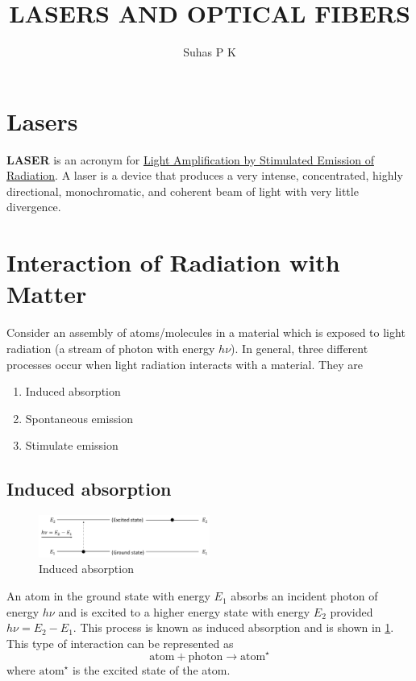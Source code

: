 \documentclass[12pt]{article}
\title{LASERS AND OPTICAL FIBERS}
\author{Suhas P K}
\affil{Department of Physics,\\ AMCEC}
\date{}
\begin{document}
\maketitle
\newpage


\newpage
\tableofcontents
\newpage

\section{Lasers}
\label{sec:Lasers}
\textbf{LASER} is an acronym for \underline{Light Amplification by Stimulated Emission of Radiation}.
A laser is a device that produces a very intense, concentrated, highly directional, monochromatic, and coherent beam of light with very little divergence.

\section{Interaction of Radiation with Matter}
Consider an assembly of atoms/molecules in a material which is exposed to light radiation (a stream of photon with energy $h\nu$). In general, three different processes occur when light radiation interacts with a material. They are \begin{enumerate}
    \item Induced absorption
    \item Spontaneous emission
    \item Stimulate emission
\end{enumerate}

\subsection{Induced absorption}
\label{subsec: Induced absorption}
\begin{figure}[h]
    \centering
    \includegraphics[width=0.5\textwidth]{indabs}
    \caption{Induced absorption}
    \label{indabs}
\end{figure}

An atom in the ground state with energy \(E_1\) absorbs an incident photon of energy \(h\nu\) and is excited to a higher energy state with energy \(E_2\) provided \(h\nu=E_2-E_1\). This process is known as induced absorption and is shown in \ref{indabs}. This type of interaction can be represented as
\[\text{atom}+\text{photon} \rightarrow \text{atom}^{\star}\]
where \(\text{atom}^{\star}\) is the excited state of the atom.
\end{document}

